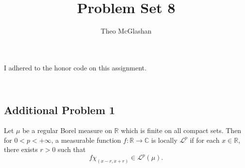 \documentclass[12pt]{article}
\title{Problem Set 8}
\author{Theo McGlashan}
\date{}
\newcommand{\R}{\mathbb{R}}
\newcommand{\C}{\mathbb{C}}
\newcommand{\qeq}[1]{\begin{equation}#1\end{equation}}
\begin{document}
\maketitle
\begin{center}
    I adhered to the honor code on this assignment.
\end{center}
\newpage
\
\newpage

\subsection*{Additional Problem 1}

Let $\mu$ be a regular Borel measure on $\R$ which is finite on all compact sets. Then for $0 < p < +\infty$, a measurable function $f : \R \to \C$ is locally $\mathcal{L}^p$ if for each $x \in \R$, there exists $r > 0$ such that
\qeq{f \chi_{(x-r, x+r)} \in \mathcal{L}^p(\mu). \label{eq:1}}
\end{document}

